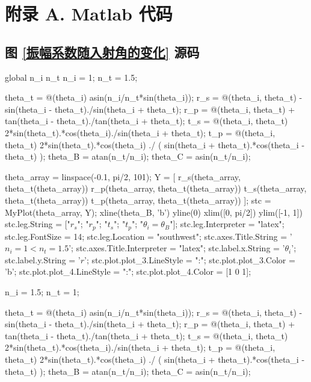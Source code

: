 \documentclass[UTF8]{report}
\theoremstyle{MyLineTheoremStyle} %
\theoremstyle{MyBlockTheoremStyle} %
\theoremstyle{MySubsubsectionStyle} %
\begin{document}
\chapter*{附录 A. Matlab 代码}   
\thispagestyle{fancy} 
\setcounter{section}{0}   
\renewcommand\thesection{A.\arabic{section}}   
\renewcommand{\thefigure}{A.\arabic{figure}} 
\renewcommand{\thetable}{A.\arabic{table}}


\section{图 \ref{振幅系数随入射角的变化} 源码}\label{图振幅系数随入射角的变化源码}
\begin{matlablisting}
global n_i n_t
n_i = 1;
n_t = 1.5;

theta_t = @(theta_i) asin(n_i/n_t*sin(theta_i));
r_s = @(theta_i, theta_t) - sin(theta_i - theta_t)./sin(theta_i + theta_t);
r_p = @(theta_i, theta_t) + tan(theta_i - theta_t)./tan(theta_i + theta_t);
t_s = @(theta_i, theta_t) 2*sin(theta_t).*cos(theta_i)./sin(theta_i + theta_t);
t_p = @(theta_i, theta_t) 2*sin(theta_t).*cos(theta_i) ./ ( sin(theta_i + theta_t).*cos(theta_i - theta_t) );
theta_B = atan(n_t/n_i);
theta_C = asin(n_t/n_i);

theta_array = linspace(-0.1, pi/2, 101);
Y = [
    r_s(theta_array, theta_t(theta_array))
    r_p(theta_array, theta_t(theta_array))
    t_s(theta_array, theta_t(theta_array))
    t_p(theta_array, theta_t(theta_array))
    ];
stc = MyPlot(theta_array, Y);
xline(theta_B, 'b')
yline(0)
xlim([0, pi/2])
ylim([-1, 1])
stc.leg.String = ["$r_s$"; "$r_p$"; "$t_s$"; "$t_p$"; "$\theta_i = \theta_B$"];
stc.leg.Interpreter = "latex";
stc.leg.FontSize = 14;
stc.leg.Location = "southwest";
stc.axes.Title.String = '$n_i = 1 < n_t = 1.5$';
stc.axes.Title.Interpreter = "latex";
stc.label.x.String = '$\theta_i$';
stc.label.y.String = '$r$';
stc.plot.plot_3.LineStyle = ":";
stc.plot.plot_3.Color = 'b';
stc.plot.plot_4.LineStyle = ":";
stc.plot.plot_4.Color = [1 0 1];

n_i = 1.5;
n_t = 1;

theta_t = @(theta_i) asin(n_i/n_t*sin(theta_i));
r_s = @(theta_i, theta_t) - sin(theta_i - theta_t)./sin(theta_i + theta_t);
r_p = @(theta_i, theta_t) + tan(theta_i - theta_t)./tan(theta_i + theta_t);
t_s = @(theta_i, theta_t) 2*sin(theta_t).*cos(theta_i)./sin(theta_i + theta_t);
t_p = @(theta_i, theta_t) 2*sin(theta_t).*cos(theta_i) ./ ( sin(theta_i + theta_t).*cos(theta_i - theta_t) );
theta_B = atan(n_t/n_i);
theta_C = asin(n_t/n_i);



\end{matlablisting}
\end{document}
